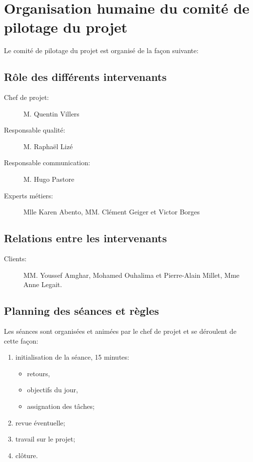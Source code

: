 
\section{Organisation humaine du comité de pilotage du projet}

Le comité de pilotage du projet est organisé de la façon suivante:

    \subsection{Rôle des différents intervenants}
\begin{description}
\item[Chef de projet:]M. Quentin Villers
\item[Responsable qualité:]M. Raphaël Lizé
\item[Responsable communication:]M. Hugo Pastore
\item[Experts métiers:]Mlle Karen Abento, MM. Clément Geiger et Victor Borges
\end{description}

    \subsection{Relations entre les intervenants}
\begin{description}
\item[Clients:]MM. Youssef Amghar, Mohamed Ouhalima et Pierre-Alain Millet,
Mme Anne Legait.
\end{description}

    \subsection{Planning des séances et règles}
Les séances sont organisées et animées par le chef de projet et se
déroulent de cette façon:
\begin{enumerate}
\item initialisation de la séance, 15 minutes:
    \begin{itemize}
        \item retours,
        \item objectifs du jour,
        \item assignation des tâches;
    \end{itemize}
\item revue éventuelle;
\item travail sur le projet;
\item clôture.
\end{enumerate}


